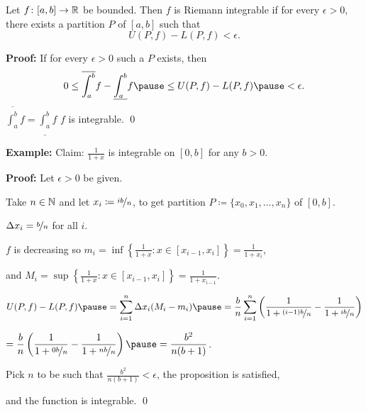 \documentclass[10pt,aspectratio=169]{beamer}
\begin{document}
\begin{frame}

\begin{proposition}
Let $f \colon [a,b] \to {\mathbb{R}}$ be bounded.  Then $f$ is Riemann
integrable if for every $\epsilon > 0$, there exists a partition $P$ of
$[a,b]$ such that
\begin{equation*}
U(P,f) - L(P,f) < \epsilon .
\end{equation*}
\end{proposition}

\pause
\textbf{Proof:}
If for every $\epsilon > 0$ such a $P$ exists, then
\begin{equation*}
0 \leq
\overline{\int_a^b} f - 
\underline{\int_a^b} f
\pause
\leq
U(P,f) - L(P,f)
\pause
< \epsilon .
\end{equation*}
\pause
\thus \quad
$\displaystyle \overline{\int_a^b} f = \underline{\int_a^b} f$
\pause
\wthus
$f$ is integrable.
\qed

\end{frame}

\begin{frame}

\textbf{Example:}
Claim: $\frac{1}{1+x}$ is integrable on $[0,b]$ for any $b > 0$.

\pause
\medskip

\textbf{Proof:} Let $\epsilon > 0$ be given.

\pause
Take $n \in {\mathbb{N}}$ and
\pause
let $x_i \coloneqq \nicefrac{ib}{n}$,
\pause
to get partition
$P \coloneqq \{ x_0,x_1,\ldots,x_n \}$ of $[0,b]$.

\pause
$\Delta x_i = \nicefrac{b}{n}$ for all $i$.  

\pause
\medskip

$f$ is decreasing so
$
m_i = \inf \left\{ \frac{1}{1+x} : x \in [x_{i-1},x_i] \right\} =
\frac{1}{1+x_i}$,

\pause
and
$M_i = \sup \left\{ \frac{1}{1+x} : x \in [x_{i-1},x_i] \right\} =
\frac{1}{1+x_{i-1}}$.

\pause
\medskip

\thus \quad
$\displaystyle
U(P,f)-L(P,f)
\pause
=
\sum_{i=1}^n
\Delta x_i
(M_i-m_i)
\pause
=
\frac{b}{n}
\sum_{i=1}^n 
\left( \frac{1}{1+\nicefrac{(i-1)b}{n}} - \frac{1}{1+\nicefrac{ib}{n}} \right) 
$

\pause
\medskip

\qquad\qquad\qquad
$\displaystyle
=
\frac{b}{n}
\left( \frac{1}{1+\nicefrac{0b}{n}} - \frac{1}{1+\nicefrac{nb}{n}} \right) 
\pause
=
\frac{b^2}{n(b+1)}$.

\pause
\medskip

Pick $n$ to be such that
$\frac{b^2}{n(b+1)} < \epsilon$,
\pause
the proposition is satisfied,

\pause
and the function is integrable. \qed
\end{frame}
\end{document}
